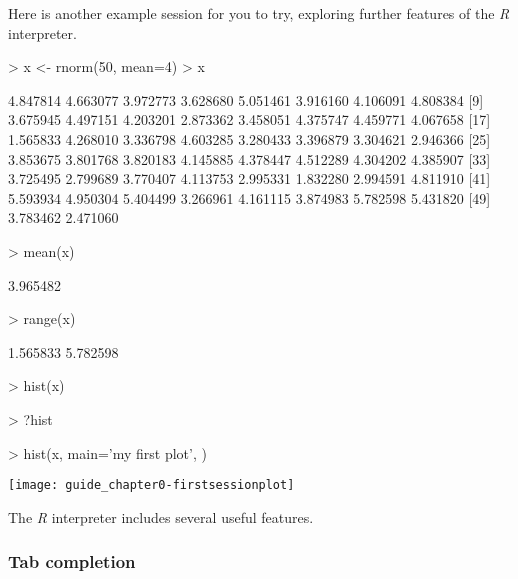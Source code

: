 \documentclass[10pt,letterpaper]{article}
\begin{document}
Here is another example session for you to try, exploring further features of the \emph{R} interpreter.

\begin{Schunk}
\begin{Sinput}
> x <- rnorm(50, mean=4)
> x
\end{Sinput}
\begin{Soutput}
 [1] 4.847814 4.663077 3.972773 3.628680 5.051461 3.916160 4.106091 4.808384
 [9] 3.675945 4.497151 4.203201 2.873362 3.458051 4.375747 4.459771 4.067658
[17] 1.565833 4.268010 3.336798 4.603285 3.280433 3.396879 3.304621 2.946366
[25] 3.853675 3.801768 3.820183 4.145885 4.378447 4.512289 4.304202 4.385907
[33] 3.725495 2.799689 3.770407 4.113753 2.995331 1.832280 2.994591 4.811910
[41] 5.593934 4.950304 5.404499 3.266961 4.161115 3.874983 5.782598 5.431820
[49] 3.783462 2.471060
\end{Soutput}
\begin{Sinput}
> mean(x)
\end{Sinput}
\begin{Soutput}
[1] 3.965482
\end{Soutput}
\begin{Sinput}
> range(x)
\end{Sinput}
\begin{Soutput}
[1] 1.565833 5.782598
\end{Soutput}
\begin{Sinput}
> hist(x)
\end{Sinput}
\end{Schunk}
\begin{Schunk}
\begin{Sinput}
> ?hist
\end{Sinput}
\end{Schunk}
\begin{center}
\begin{Schunk}
\begin{Sinput}
> hist(x, main='my first plot', )
\end{Sinput}
\end{Schunk}
\texttt{[image: guide\_chapter0-firstsessionplot]}
\end{center}


The \emph{R} interpreter includes several useful features.

\subsubsection{Tab completion} %
\label{ssub:tab_completion}
\end{document}
